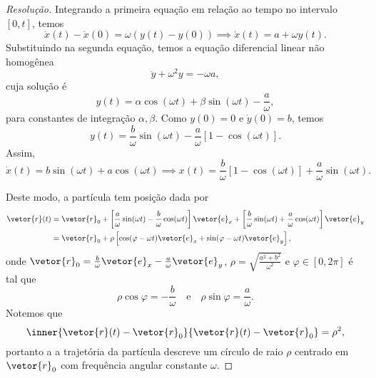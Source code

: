 \begin{proof}[Resolução]
    Integrando a primeira equação em relação ao tempo no intervalo \([0,t]\), temos
    \begin{equation*}
        \dot{x}(t) - \dot{x}(0) = \omega(y(t) - y(0)) \implies \dot{x}(t) = a + \omega y(t).
    \end{equation*}
    Substituindo na segunda equação, temos a equação diferencial linear não homogênea
    \begin{equation*}
        \ddot{y} + \omega^2 y = - \omega a,
    \end{equation*}
    cuja solução é
    \begin{equation*}
        y(t) = \alpha \cos(\omega t) + \beta \sin(\omega t) - \frac{a}{\omega},
    \end{equation*}
    para constantes de integração \(\alpha, \beta\). Como \(y(0) = 0\) e \(\dot{y}(0) = b\), temos
    \begin{equation*}
        y(t) = \frac{b}{\omega}\sin(\omega t) -  \frac{a}{\omega}\left[1 - \cos(\omega t)\right].
    \end{equation*}
    Assim,
    \begin{equation*}
        \dot{x}(t) = b\sin(\omega t) +  a \cos(\omega t) \implies x(t) = \frac{b}{\omega}\left[1 - \cos(\omega t)\right]+\frac{a}{\omega} \sin(\omega t).
    \end{equation*}

    Deste modo, a partícula tem posição dada por
    \begin{align*}
        \vetor{r}(t) &= \vetor{r}_0 + \left[\frac{a}{\omega} \sin(\omega t) - \frac{b}{\omega}\cos(\omega t)\right]\vetor{e}_x + \left[\frac{b}{\omega} \sin(\omega t) + \frac{a}{\omega}\cos(\omega t)\right]\vetor{e}_y\\
                     &= \vetor{r}_0 + \rho\left[\cos(\varphi - \omega t)\vetor{e}_x + \sin(\varphi-\omega t)\vetor{e}_y\right],
    \end{align*}
    onde \(\vetor{r}_0 = \frac{b}{\omega}\vetor{e}_x - \frac{a}{\omega}\vetor{e}_y\), \(\rho = \sqrt{\frac{a^2 + b^2}{\omega^2}}\) e \(\varphi \in [0, 2\pi]\) é tal que
    \begin{equation*}
        \rho\cos\varphi = -\frac{b}{\omega}\quad\text{e}\quad\rho\sin\varphi = \frac{a}{\omega}.
    \end{equation*}
    Notemos que
    \begin{equation*}
        \inner{\vetor{r}(t) - \vetor{r}_0}{\vetor{r}(t) - \vetor{r}_0} = \rho^2,
    \end{equation*}
    portanto a a trajetória da partícula descreve um círculo de raio \(\rho\) centrado em \(\vetor{r}_0\) com frequência angular constante \(\omega\).
\end{proof}
